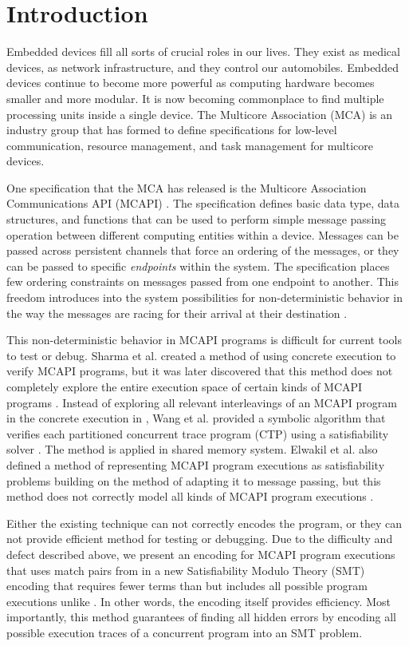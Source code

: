 \section{Introduction}
Embedded devices fill all sorts of crucial roles in our lives. They exist as
medical devices, as network infrastructure, and they control our automobiles.
Embedded devices continue to become more powerful as computing hardware becomes
smaller and more modular. It is now becoming commonplace to find multiple
processing units inside a single device. The Multicore Association (MCA) \cite{mca} is an
industry group that has formed to define specifications for low-level
communication, resource management, and task management for
multicore devices.

One specification that the MCA has released is the Multicore Association
Communications API (MCAPI) \cite{mcapi}. The specification defines basic data type, data
structures, and functions that can be used to perform simple message passing
operation between different computing entities within a device. Messages can be
passed across persistent channels that force an ordering of the messages, or
they can be passed to specific \emph{endpoints} within the system. The specification places few ordering constraints on messages passed from one
endpoint to another. This freedom introduces into the system possibilities for
non-deterministic behavior in the way the messages are racing for their arrival at their destination \cite{netzer:spdt96}.

This non-deterministic behavior in MCAPI programs is difficult for current tools to test or debug. Sharma et al. created a method of using concrete execution to verify MCAPI
programs, but it was later discovered that this method does not completely
explore the entire execution space of certain kinds of MCAPI programs \cite{sharma:fmcad09}. Instead of exploring all relevant interleavings of an MCAPI program in the concrete execution in \cite{sharma:fmcad09}, Wang et al. provided a symbolic algorithm that verifies each partitioned concurrent trace program (CTP) using a satisfiability solver \cite{wang:fse09}. The method is applied in shared memory system. Elwakil et al. also defined a method of representing MCAPI program executions as satisfiability problems building on the method of \cite{wang:fse09} adapting it to message passing, but this method does not correctly model all kinds of
MCAPI program executions \cite{elwakil:padtad10}.

Either the existing technique can not correctly encodes the program, or they can not provide efficient method for testing or debugging.
Due to the difficulty and defect described above, %
we present an encoding for MCAPI program executions that uses match pairs from \cite{sharma:fmcad09} in a new Satisfiability Modulo Theory (SMT) encoding that requires fewer terms than \cite{elwakil:padtad10} but includes all possible program executions unlike \cite{elwakil:padtad10}. In other words, the encoding itself provides efficiency. Most importantly, this method guarantees of finding all hidden errors by encoding all possible execution traces of a concurrent program into an SMT problem.


